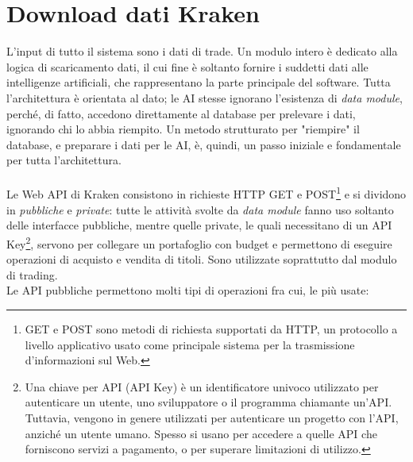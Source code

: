 \documentclass[a4paper,12pt]{report}
\begin{document}
\section{Download dati Kraken}
L'input di tutto il sistema sono i dati di trade. Un modulo intero è dedicato alla logica di scaricamento dati, il cui fine è soltanto fornire i suddetti dati alle intelligenze artificiali, che rappresentano la parte principale del software. Tutta l'architettura è orientata al dato; le AI stesse ignorano l'esistenza di \textit{data module}, perché, di fatto, accedono direttamente al database per prelevare i dati, ignorando chi lo abbia riempito. Un metodo strutturato per "riempire" il database, e preparare i dati per le AI, è, quindi, un passo iniziale e fondamentale per tutta l'architettura.\\~\\
Le Web API di Kraken consistono in richieste HTTP GET e POST\footnote{GET e POST sono metodi di richiesta supportati da HTTP, un protocollo a livello applicativo usato come principale sistema per la trasmissione d'informazioni sul Web.} e si dividono in \textit{pubbliche} e \textit{private}: tutte le attività svolte da \textit{data module} fanno uso soltanto delle interfacce pubbliche, mentre quelle private, le quali necessitano di un API Key\footnote{Una chiave per API (API Key) è un identificatore univoco utilizzato per autenticare un utente, uno sviluppatore o il programma chiamante un'API. Tuttavia, vengono in genere utilizzati per autenticare un progetto con l'API, anziché un utente umano. Spesso si usano per accedere a quelle API che forniscono servizi a pagamento, o per superare limitazioni di utilizzo.}, servono per collegare un portafoglio con budget e permettono di eseguire operazioni di acquisto e vendita di titoli. Sono utilizzate soprattutto dal modulo di trading.\\
Le API pubbliche permettono molti tipi di operazioni fra cui, le più usate:
\end{document}
